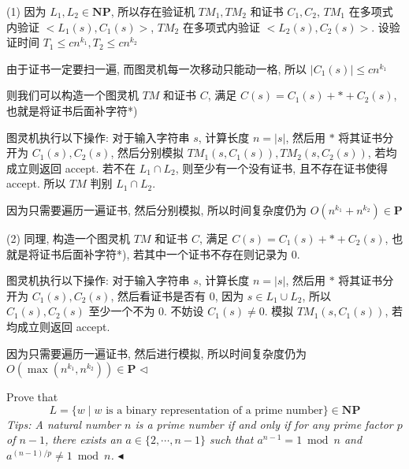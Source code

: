 \documentclass[11pt]{article}
\newcommand{\mP}{\mathbf{P}}
\newcommand{\NP}{\mathbf{NP}}
\newenvironment{problem}[2][Problem]{\begin{trivlist}
		\item[\hskip \labelsep {\bfseries #1}\hskip \labelsep {\bfseries #2.}]}{\hfill$\blacktriangleleft$\end{trivlist}}
\newenvironment{answer}[1][Answer]{\begin{trivlist}
		\item[\hskip \labelsep {\bfseries #1.}\hskip \labelsep]}{\hfill$\lhd$\end{trivlist}}
\begin{document}
	\begin{answer}
		(1) 因为 $L_1,L_2\in\NP$, 所以存在验证机 $TM_1,TM_2$ 和证书 $C_1,C_2$, $TM_1$ 在多项式内验证 $<L_1(s),C_1(s)>$, $TM_2$ 在多项式内验证 $<L_2(s),C_2(s)>$. 设验证时间 $T_1\leq cn^{k_{1}},T_2\leq cn^{k_2}$
		
		由于证书一定要扫一遍, 而图灵机每一次移动只能动一格, 所以 $|C_1(s)|\leq cn^{k_{1}}$
		
		则我们可以构造一个图灵机 $TM$ 和证书 $C$, 满足 $C(s)=C_1(s)+*+C_2(s)$, 也就是将证书后面补字符*)
		
		图灵机执行以下操作:
		对于输入字符串 $s$, 计算长度 $n=|s|$, 然后用 $*$ 将其证书分开为 $C_1(s),C_2(s)$, 然后分别模拟 $TM_1(s,C_1(s)),TM_2(s,C_2(s))$, 若均成立则返回 accept. 若不在 $L_1 \cap L_2$, 则至少有一个没有证书, 且不存在证书使得 accept. 所以 $TM$ 判别 $L_1 \cap L_2$.
		
		因为只需要遍历一遍证书, 然后分别模拟, 所以时间复杂度仍为 $O(n^{k_{1}}+n^{k_2})\in \mP$
		
		(2) 同理, 构造一个图灵机 $TM$ 和证书 $C$, 满足 $C(s)=C_1(s)+*+C_2(s)$, 也就是将证书后面补字符*), 若其中一个证书不存在则记录为 $0$.
		
		图灵机执行以下操作:
		对于输入字符串 $s$, 计算长度 $n=|s|$, 然后用 $*$ 将其证书分开为 $C_1(s),C_2(s)$, 然后看证书是否有 $0$, 因为 $s\in L_1 \cup L_2$, 所以 $C_1(s),C_2(s)$ 至少一个不为 $0$. 不妨设 $C_1(s)\neq 0$. 模拟 $TM_1(s,C_1(s))$, 若均成立则返回 accept. 
		
		因为只需要遍历一遍证书, 然后进行模拟, 所以时间复杂度仍为 $O(\max(n^{k_{1}},n^{k_2}))\in\mP$
	\end{answer}
	\begin{problem}{3.(12 points)}
		Prove that \[L = \{w \mid w \text{ is a binary representation of a prime number}\}\in \NP\]
		\emph{Tips: A natural number $n$ is a prime number if and only if for any prime factor $p$ of $n-1$, there exists an $a \in \{2, \cdots, n-1\}$ such that $a^{n-1}  = 1 \bmod n$ and $a^{(n-1)/p} \neq 1 \bmod n$.}
	\end{problem}
\end{document}
